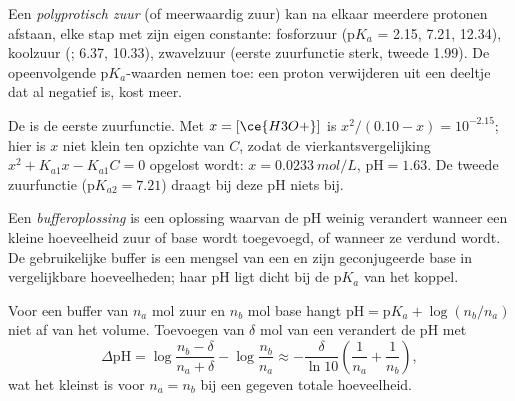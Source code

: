 \begin{definition}\label{def:b1:predominant-reaction:polyprotic}
Een \emph{polyprotisch zuur} (of meerwaardig
zuur) kan na elkaar meerdere protonen afstaan, elke stap met zijn eigen
constante: fosforzuur  ($\mathrm{p}K_a$ = 2.15, 7.21, 12.34),
koolzuur (; 6.37, 10.33), zwavelzuur (eerste zuurfunctie
sterk, tweede 1.99). De opeenvolgende $\mathrm{p}K_a$-waarden nemen toe:
een proton verwijderen uit een deeltje dat al negatief is, kost meer.
\end{definition}

\begin{example}\label{ex:b1:predominant-reaction:h3po4}
De  is de eerste zuurfunctie. Met $x = [\ce{H3O+}]$
is $x^2/(0.10 - x) = 10^{-2.15}$; hier is $x$ niet klein ten opzichte van
$C$, zodat de vierkantsvergelijking $x^2 + K_{a1}x - K_{a1}C = 0$ opgelost
wordt: $x =
\qty{0.0233}{mol/L}$, $\mathrm{pH} = 1.63$. De tweede zuurfunctie
($\mathrm{p}K_{a2} = 7.21$) draagt bij deze pH niets bij.
\end{example}

\begin{definition}[Bufferoplossing]\label{def:b1:predominant-reaction:buffer}
Een \emph{bufferoplossing} is een oplossing
waarvan de pH weinig verandert wanneer een kleine hoeveelheid zuur of
base wordt toegevoegd, of wanneer ze verdund wordt. De gebruikelijke
buffer is een mengsel van een  en zijn geconjugeerde base in
vergelijkbare hoeveelheden; haar pH ligt dicht bij de $\mathrm{p}K_a$ van
het koppel.
\end{definition}

\begin{proposition}\label{prop:b1:predominant-reaction:buffer}
Voor een buffer van $n_a$ mol zuur en $n_b$ mol base hangt $\mathrm{pH} =
\mathrm{p}K_a + \log(n_b/n_a)$ niet af van het volume. Toevoegen van
$\delta$ mol van een  verandert de pH met
\[
  \Delta\mathrm{pH} = \log\frac{n_b - \delta}{n_a + \delta} - \log\frac{n_b}{n_a}
  \approx -\frac{\delta}{\ln 10}\left(\frac{1}{n_a} + \frac{1}{n_b}\right),
\]
wat het kleinst is voor $n_a = n_b$ bij een gegeven totale hoeveelheid.
\end{proposition}

